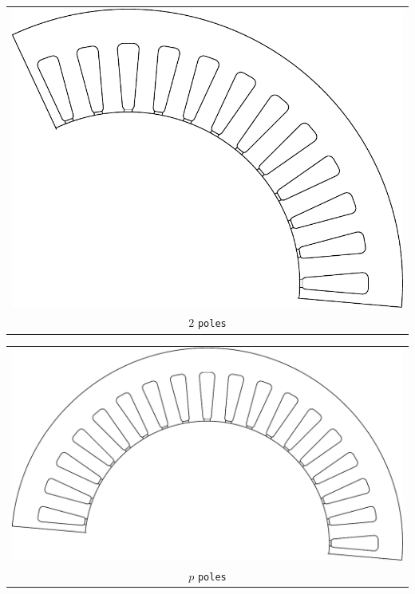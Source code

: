\documentclass[a4paper,11pt,oneside,fleqn,titlepage]{report}
\begin{document}
\begin{tabular}{c}
\includegraphics[scale=0.75]{../examples/stators/2pole} 
\\
$ 2 $ \texttt{poles}
\end{tabular}
\vspace{5mm}

\begin{tabular}{c}
\includegraphics[scale=0.75]{../examples/stators/ppole} 
\\
$ p $ \texttt{poles}
\end{tabular}
\vspace{5mm}
\end{document}
